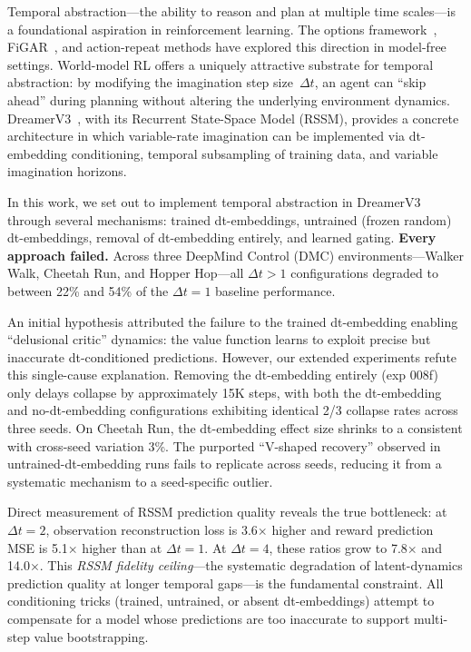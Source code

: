 \documentclass[10pt,letterpaper]{article}
\newcommand{\dt}{\Delta t}
\begin{document}
Temporal abstraction---the ability to reason and plan at multiple time scales---is a foundational aspiration in reinforcement learning.
The options framework~\citep{sutton1999options}, FiGAR~\citep{sharma2017figar}, and action-repeat methods have explored this direction in model-free settings.
World-model RL offers a uniquely attractive substrate for temporal abstraction: by modifying the imagination step size~$\dt$, an agent can ``skip ahead'' during planning without altering the underlying environment dynamics.
DreamerV3~\citep{hafner2023dreamerv3}, with its Recurrent State-Space Model (RSSM), provides a concrete architecture in which variable-rate imagination can be implemented via dt-embedding conditioning, temporal subsampling of training data, and variable imagination horizons.

In this work, we set out to implement temporal abstraction in DreamerV3 through several mechanisms: trained dt-embeddings, untrained (frozen random) dt-embeddings, removal of dt-embedding entirely, and learned gating.
\textbf{Every approach failed.}
Across three DeepMind Control (DMC) environments---Walker Walk, Cheetah Run, and Hopper Hop---all $\dt>1$ configurations degraded to between 22\% and 54\% of the $\dt=1$ baseline performance.

An initial hypothesis attributed the failure to the trained dt-embedding enabling ``delusional critic'' dynamics: the value function learns to exploit precise but inaccurate dt-conditioned predictions.
However, our extended experiments refute this single-cause explanation.
Removing the dt-embedding entirely (exp 008f) only delays collapse by approximately 15K steps, with both the dt-embedding and no-dt-embedding configurations exhibiting identical 2/3 collapse rates across three seeds.
On Cheetah Run, the dt-embedding effect size shrinks to a consistent with cross-seed variation 3\%.
The purported ``V-shaped recovery'' observed in untrained-dt-embedding runs fails to replicate across seeds, reducing it from a systematic mechanism to a seed-specific outlier.

Direct measurement of RSSM prediction quality reveals the true bottleneck: at $\dt=2$, observation reconstruction loss is 3.6$\times$ higher and reward prediction MSE is 5.1$\times$ higher than at $\dt=1$.
At $\dt=4$, these ratios grow to 7.8$\times$ and 14.0$\times$.
This \emph{RSSM fidelity ceiling}---the systematic degradation of latent-dynamics prediction quality at longer temporal gaps---is the fundamental constraint.
All conditioning tricks (trained, untrained, or absent dt-embeddings) attempt to compensate for a model whose predictions are too inaccurate to support multi-step value bootstrapping.
\end{document}
